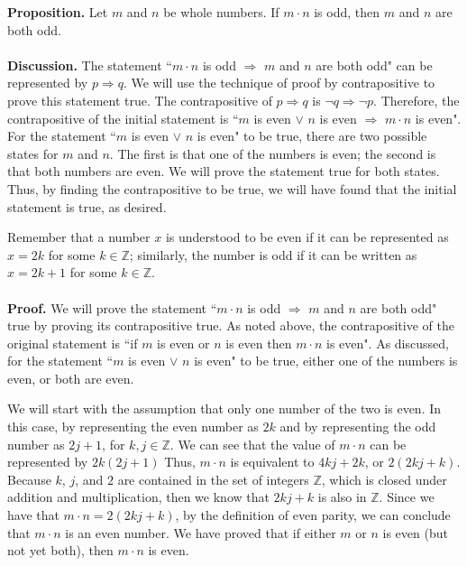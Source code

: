\documentclass[12pt]{exam}
\begin{document}
\begin{questions}
\question
\textbf{Proposition.} Let $m$ and $n$ be whole numbers. If $m\cdot n$ is odd, then $m$ and $n$ are both odd.
\\
\\\textbf{Discussion.} The statement ``$m\cdot n$ is odd $\Rightarrow$ $m$ and $n$ are both odd" can be represented by $p\Rightarrow q$. We will use the technique of proof by contrapositive to prove this statement true. The contrapositive of $p\Rightarrow q$ is $\neg q \Rightarrow \neg p$. Therefore, the contrapositive of the initial statement is ``$m$ is even $\vee$ $n$ is even $\Rightarrow$ $m\cdot n$ is even". For the statement ``$m$ is even $\vee$ $n$ is even" to be true, there are two possible states for $m$ and $n$. The first is that one of the numbers is even; the second is that both numbers are even. We will prove the statement true for both states. Thus, by finding the contrapositive to be true, we will have found that the initial statement is true, as desired.
\par
Remember that a number $x$ is understood to be even if it can be represented as $x=2k$ for some  $k \in \mathbb Z$; similarly, the number is odd if it can be written as $x=2k+1$ for some $k \in \mathbb Z$. 
\\
\\\textbf{Proof.} We will prove the statement ``$m\cdot n$ is odd $\Rightarrow$ $m$ and $n$ are both odd" true by proving its contrapositive true. As noted above, the contrapositive of the original statement is ``if $m$ is even or $n$ is even then $m\cdot n$ is even". As discussed, for the statement ``$m$ is even $\vee$ $n$ is even" to be true, either one of the numbers is even, or both are even.
\par
We will start with the assumption that only one number of the two is even. In this case, by representing the even number as $2k$ and by representing the odd number as $2j+1$, for $k,j \in \mathbb Z$. We can see that the value of $m \cdot n$ can be represented by $2k(2j+1)$ Thus, $m \cdot n$ is equivalent to $4kj + 2k$, or $2(2kj+k)$. Because $k$, $j$, and $2$ are contained in the set of integers $\mathbb Z$, which is closed under addition and multiplication, then we know that $2kj+k$ is also in $\mathbb Z$. Since we have that $m \cdot n = 2(2kj+k)$, by the definition of even parity, we can conclude that  $m \cdot n$ is an even number. We have proved that if either $m$ or $n$ is even (but not yet both), then $m\cdot n$ is even.
\par 

\end{questions}
\end{document}
